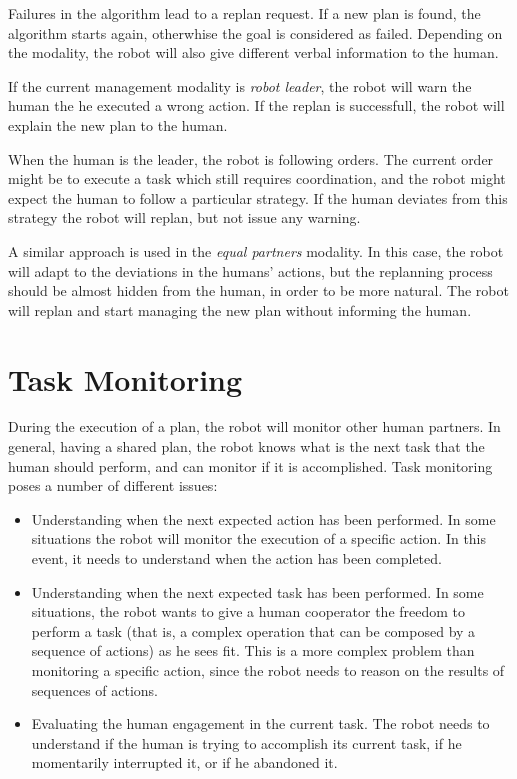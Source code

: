 Failures in the algorithm lead to a replan request. If a new plan is found, the algorithm starts again, otherwhise the goal is considered as failed. Depending on the modality, the robot will also give different verbal information to the human.

If the current management modality is \textit{robot leader}, the robot will warn the human the he executed a wrong action. If the replan is successfull, the robot will explain the new plan to the human. 

When the human is the leader, the robot is following orders. The current order might be to execute a task which still requires coordination, and the robot might expect the human to follow a particular strategy. If the human deviates from this strategy the robot will replan, but not issue any warning.

A similar approach is used in the \textit{equal partners} modality. In this case, the robot will adapt to the deviations in the humans' actions, but the replanning process should be almost hidden from the human, in order to be more natural. The robot will replan and start managing the new plan without informing the human.


\section{Task Monitoring}
\label{sec:plan_management-plan_monitoring}

During the execution of a plan, the robot will monitor other human partners. In general, having a shared plan, the robot knows what is the next task that the human should perform, and can monitor if it is accomplished. Task monitoring poses a number of different issues:
\begin{itemize}
\item Understanding when the next expected action has been performed. In some situations the robot will monitor the execution of a specific action. In this event, it needs to understand when the action has been completed.
\item Understanding when the next expected task has been performed. In some situations, the robot wants to give a human cooperator the freedom to perform a task (that is, a complex operation that can be composed by a sequence of actions) as he sees fit. This is a more complex problem than monitoring a specific action, since the robot needs to reason on the results of sequences of actions.
\item Evaluating the human engagement in the current task. The robot needs to understand if the human is trying to accomplish its current task, if he momentarily interrupted it, or if he abandoned it.
\end{itemize}

